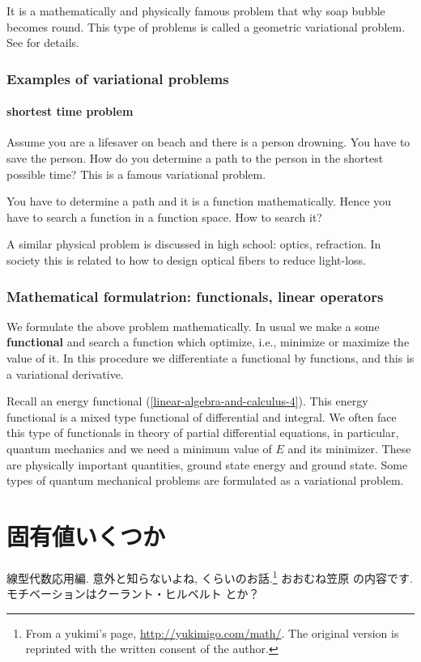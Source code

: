 \documentclass[openany, a4paper, oneside]{jsbook}
\theoremstyle{break}
\theoremstyle{breakdefn}
\begin{document}
It is a mathematically and physically famous problem that why soap bubble becomes round.
This type of problems is called a geometric variational problem.
See \cite{SeikiNishikawa1} for details.
\subsection{Examples of variational problems}

\subsubsection{shortest time problem}


Assume you are a lifesaver on beach and there is a person drowning.
You have to save the person.
How do you determine a path to the person in the shortest possible time?
This is a famous variational problem.

You have to determine a path and it is a function mathematically.
Hence you have to search a function in a function space.
How to search it?

A similar physical problem is discussed in high school: optics, refraction.
In society this is related to how to design optical fibers to reduce light-loss.
\subsection{Mathematical formulatrion: functionals, linear operators}


We formulate the above problem mathematically.
In usual we make a some \textbf{functional} and search a function
which optimize, i.e., minimize or maximize the value of it.
In this procedure we differentiate a functional by functions,
and this is a variational derivative.

Recall an energy functional (\ref{linear-algebra-and-calculus-4}).
This energy functional is a mixed type functional of differential and integral.
We often face this type of functionals in theory of partial differential equations,
in particular, quantum mechanics and we need a minimum value of $E$ and its minimizer.
These are physically important quantities, ground state energy and ground state.
Some types of quantum mechanical problems are formulated as a variational problem.
\chapter{固有値いくつか}


線型代数応用編. 意外と知らないよね, くらいのお話.\footnote{From a yukimi's page, \href{http://yukimigo.com/math/}{http://yukimigo.com/math/}.
The original version is reprinted with the written consent of the author.
 }
おおむね笠原 \cite{KoujiKasahara1}の内容です.
モチベーションはクーラント・ヒルベルト \cite{CourantHilbert1}とか？
\end{document}
